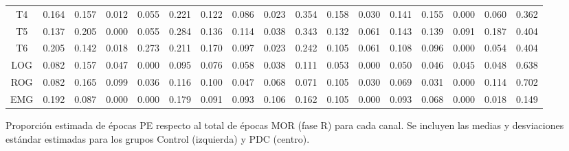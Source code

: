 \begin{SidewaysFigure}
\begin{tabular}{c||ccccc|cc||cccc|cc||ccc}
T4&0.164&0.157&0.012&0.055&0.221&0.122&0.086&0.023&0.354&0.158&0.030&0.141&0.155&0.000&0.060&0.362 \\
T5&0.137&0.205&0.000&0.055&0.284&0.136&0.114&0.038&0.343&0.132&0.061&0.143&0.139&0.091&0.187&0.404 \\
T6&0.205&0.142&0.018&0.273&0.211&0.170&0.097&0.023&0.242&0.105&0.061&0.108&0.096&0.000&0.054&0.404 \\
LOG&0.082&0.157&0.047&0.000&0.095&0.076&0.058&0.038&0.111&0.053&0.000&0.050&0.046&0.045&0.048&0.638 \\
ROG&0.082&0.165&0.099&0.036&0.116&0.100&0.047&0.068&0.071&0.105&0.030&0.069&0.031&0.000&0.114&0.702 \\
EMG&0.192&0.087&0.000&0.000&0.179&0.091&0.093&0.106&0.162&0.105&0.000&0.093&0.068&0.000&0.018&0.149
\end{tabular}
\caption{Proporci\'on estimada de \'epocas PE respecto al total de \'epocas MOR 
(fase R) para cada
canal. Se incluyen las medias y desviaciones est\'andar estimadas para los grupos 
Control (izquierda) y PDC (centro).}
\label{gpos_mor}
\end{SidewaysFigure}

